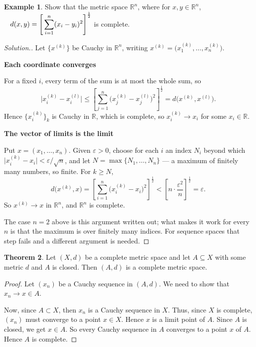 \documentclass[11pt,a4paper]{article}
\theoremstyle{definition}
\newtheorem{thm}{Theorem}[section]
\newtheorem{exa}[thm]{Example}
\newenvironment{solution}
  {\renewcommand{\qedsymbol}{}\begin{proof}[\textit{Solution}.]}
  {\end{proof}}
\newcommand{\subhead}[1]{%
  \par\medskip\noindent\textbf{#1}\par\nobreak\smallskip}
\begin{document}
\begin{exa}
Show that the metric space $\mathbb{R}^n$, where for $x,y\in \mathbb{R}^n$, $\hspace{0.3cm}\displaystyle{ d(x,y)=\Bigg[\sum^n_{i=1}(x_i-y_i)^2\Bigg]^{\frac{1}{2}}}$ is complete.

\end{exa}

\begin{solution}
Let $\{x^{(k)}\}$ be Cauchy in $\mathbb{R}^n$, writing
$x^{(k)}=\big(x^{(k)}_1,\dots,x^{(k)}_n\big)$.

\subhead{Each coordinate converges}
For a fixed $i$, every term of the sum is at most the whole sum, so
$$\big|x^{(k)}_i-x^{(l)}_i\big|\leq
\left[\sum_{j=1}^{n}\big(x^{(k)}_j-x^{(l)}_j\big)^2\right]^{\frac12}
=d\big(x^{(k)},x^{(l)}\big).$$
Hence $\{x^{(k)}_i\}_k$ is Cauchy in $\mathbb{R}$, which is complete, so
$x^{(k)}_i\rightarrow x_i$ for some $x_i\in\mathbb{R}$.

\subhead{The vector of limits is the limit}
Put $x=(x_1,\dots,x_n)$. Given $\varepsilon>0$, choose for each $i$ an index
$N_i$ beyond which $\big|x^{(k)}_i-x_i\big|<\varepsilon/\sqrt{n}$, and let
$N=\max\{N_1,\dots,N_n\}$ --- a maximum of finitely many numbers, so finite.
For $k\geq N$,
$$d\big(x^{(k)},x\big)=\left[\sum_{i=1}^{n}\big(x^{(k)}_i-x_i\big)^2\right]^{\frac12}
<\left[n\cdot\frac{\varepsilon^2}{n}\right]^{\frac12}=\varepsilon .$$
So $x^{(k)}\rightarrow x$ in $\mathbb{R}^n$, and $\mathbb{R}^n$ is complete.

The case $n=2$ above is this argument written out; what makes it work for every
$n$ is that the maximum is over finitely many indices. For sequence spaces that
step fails and a different argument is needed.
\end{solution}


\begin{thm}
Let $(X,d)$ be a complete metric space and let $A\subseteq X$ with some metric $d$ and $A$ is closed. Then $(A,d)$ is a complete metric space.

\end{thm}

\begin{proof}
Let $(x_n)$ be a Cauchy sequence in $(A,d)$. We need to show that $x_n\rightarrow x\in A$.

Now, since $A\subset X$, then $x_n$ is a Cauchy sequence in $X$. Thus, since $X$ is complete, $(x_n)$ must converge to a point $x\in X$. Hence $x$ is a limit point of $A$. Since $A$ is closed, we get $x\in A$. So every Cauchy sequence in $A$ converges to a point $x$ of $A$.  Hence $A$ is complete.

\end{proof}
\end{document}
